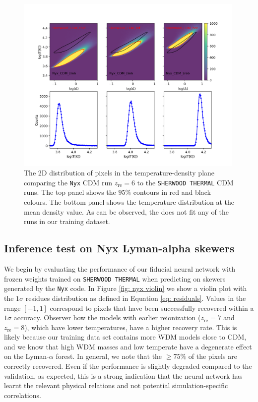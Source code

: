 \begin{figure}
    \centering
    \includegraphics[width=0.99\textwidth,trim={5cm 0 3cm 4cm},clip]{img/ML/TD_plane_nyx_sher.png}
    \caption{The 2D distribution of pixels in the temperature-density plane comparing the \texttt{Nyx} CDM run $z_\mathrm{re}=6$ to the \texttt{SHERWOOD THERMAL} CDM runs. The top panel shows the $95\%$ contours in red and black colours. The bottom panel shows the temperature distribution at the mean density value. As can be observed, the  does not fit any of the runs in our training dataset.}
    \label{fig: nyx TD}
\end{figure}

\subsection{Inference test on Nyx Lyman-alpha skewers}
We begin by evaluating the performance of our fiducial neural network with frozen weights trained on \texttt{SHERWOOD THERMAL} when predicting on skewers generated by the \texttt{Nyx} code. In Figure \ref{fig: nyx violin} we show a violin plot with the $1\sigma$ residues distribution as defined in Equation \ref{eq: residuals}. Values in the range $[-1,1]$ correspond to pixels that have been successfully recovered within a $1\sigma$ accuracy. Observer how the models with earlier reionization ($z_\mathrm{re}=7$ and $z_\mathrm{re}=8$), which have lower temperatures, have a higher recovery rate. This is likely because our training data set contains more WDM models close to CDM, and we know that high WDM masses and low temperate have a degenerate effect on the Lyman-$\alpha$ forest. In general, we note that the $\geq 75 \%$ of the pixels are correctly recovered. Even if the performance is slightly degraded compared to the  validation, as expected, this is a strong indication that the neural network has learnt the relevant physical relations and not potential simulation-specific correlations.

